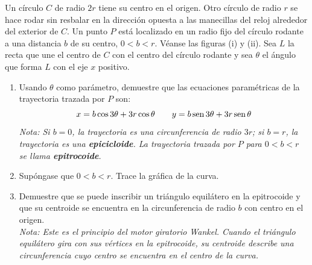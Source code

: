 \item Un círculo $C$ de radio $2r$ tiene su centro en el origen. Otro círculo de radio $r$ se hace rodar sin resbalar en la dirección opuesta a las manecillas del reloj alrededor del exterior de $C$. Un punto $P$ está localizado en un radio fijo del círculo rodante a una distancia $b$ de su centro, $0 < b < r$. Véanse las figuras (i) y (ii). Sea $L$ la recta que une el centro de $C$ con el centro del círculo rodante y sea $\theta$ el ángulo que forma $L$ con el eje $x$ positivo.
    \begin{enumerate}
        \item[(a)] Usando $\theta$ como parámetro, demuestre que las ecuaciones paramétricas de la trayectoria trazada por $P$ son:
        \[ x = b \cos 3\theta + 3r \cos\theta \qquad y = b \operatorname{sen} 3\theta + 3r \operatorname{sen}\theta \]
        \textit{Nota: Si $b = 0$, la trayectoria es una circunferencia de radio $3r$; si $b = r$, la trayectoria es una \textbf{epicicloide}. La trayectoria trazada por $P$ para $0 < b < r$ se llama \textbf{epitrocoide}.}
        \item[(b)] Supóngase que $0 < b < r$. Trace la gráfica de la curva.
        \item[(c)] Demuestre que se puede inscribir un triángulo equilátero en la epitrocoide y que su centroide se encuentra en la circunferencia de radio $b$ con centro en el origen. \\
        \textit{Nota: Este es el principio del motor giratorio Wankel. Cuando el triángulo equilátero gira con sus vértices en la epitrocoide, su centroide describe una circunferencia cuyo centro se encuentra en el centro de la curva.}
    \end{enumerate}
    
    \begin{center}
    \hspace{1cm}
    \end{center}

